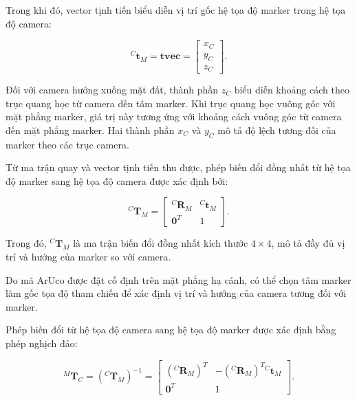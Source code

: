 Trong khi đó, vector tịnh tiến biểu diễn vị trí
gốc hệ tọa độ marker trong hệ tọa độ camera:

\begin{equation}
    {}^{C}\mathbf{t}_{M}
    =
    \mathbf{tvec}
    =
    \begin{bmatrix}
        x_C\\
        y_C\\
        z_C
    \end{bmatrix}.
    \label{eq:aruco_translation}
\end{equation}

Đối với camera hướng xuống mặt đất, thành phần
$z_C$ biểu diễn khoảng cách theo trục quang học
từ camera đến tâm marker. Khi trục quang học
vuông góc với mặt phẳng marker, giá trị này
tương ứng với khoảng cách vuông góc từ camera
đến mặt phẳng marker. Hai thành phần $x_C$
và $y_C$ mô tả độ lệch tương đối của marker
theo các trục camera.

Từ ma trận quay và vector tịnh tiến thu được,
phép biến đổi đồng nhất từ hệ tọa độ marker
sang hệ tọa độ camera được xác định bởi:

\begin{equation}
{}^{C}\mathbf{T}_{M}
=
\begin{bmatrix}
{}^{C}\mathbf{R}_{M} &
{}^{C}\mathbf{t}_{M}\\
\mathbf{0}^{T} & 1
\end{bmatrix}.
\label{eq:marker_to_camera}
\end{equation}

Trong đó, ${}^{C}\mathbf{T}_{M}$ là ma trận
biến đổi đồng nhất kích thước $4\times4$,
mô tả đầy đủ vị trí và hướng của marker
so với camera.

Do mã ArUco được đặt cố định trên mặt phẳng
hạ cánh, có thể chọn tâm marker làm gốc tọa độ
tham chiếu để xác định vị trí và hướng của
camera tương đối với marker.

Phép biến đổi từ hệ tọa độ camera sang hệ
tọa độ marker được xác định bằng phép nghịch đảo:

\begin{equation}
{}^{M}\mathbf{T}_{C}
=
\left({}^{C}\mathbf{T}_{M}\right)^{-1}
=
\begin{bmatrix}
({}^{C}\mathbf{R}_{M})^{T} &
-({}^{C}\mathbf{R}_{M})^{T}
{}^{C}\mathbf{t}_{M}\\
\mathbf{0}^{T} & 1
\end{bmatrix}.
\label{eq:camera_in_marker}
\end{equation}

